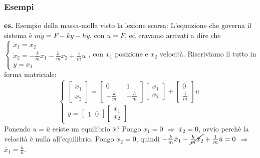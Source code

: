 \subsubsection{Esempi}
\textbf{es.} Esempio della massa-molla visto la lezione scorsa:\newline
L'equazione che governa il sistema è $m \ddot{y} = F - ky - h \dot{y}$, con $u = F$, ed eravamo arrivati a dire che $\begin{cases}
    \dot{x}_1 = x_2\\
    \dot{x}_2 = - \frac{k}{m}x_1 - \frac{h}{m}x_2 + \frac{1}{m}u\\
    y = x_1
\end{cases}$, con $x_1$ posizione e $x_2$ velocità.\newline
Riscriviamo il tutto in forma matriciale:
\[
    \begin{cases}
        \left[\begin{matrix}
            \dot{x}_1\\
            \dot{x}_2
        \end{matrix}\right] = \left[\begin{matrix}
            0 \;\; &1\\
            - \frac{k}{m} \;\;& - \frac{h}{m}
        \end{matrix}\right] \left[\begin{matrix}
            x_1\\
            x_2
        \end{matrix}\right] + \left[\begin{matrix}
            0 \\
            \frac{1}{m}
        \end{matrix}\right] u\\
        y = \left[\begin{matrix}
            1 \;\;0
        \end{matrix}\right] \left[\begin{matrix}
            x_1\\
            x_2
        \end{matrix}\right]
    \end{cases}
\]
Ponendo $u = \bar{u}$ esiste un equilibrio $\bar{x}$?\newline
Pongo $\dot{x}_1 = 0$ $\Longrightarrow$ $\bar{x}_2 = 0$, ovvio perchè la velocità è nulla all'equilibrio.\newline
Pongo $\dot{x}_2 = 0$, quindi $- \frac{k}{m} \bar{x}_1 - \cancel{ \frac{h}{m}\bar{x}_2} + \frac{1}{m}\bar{u} = 0$ $\Longrightarrow$ $\bar{x}_1 = \frac{\bar{u}}{k}$.\newline
